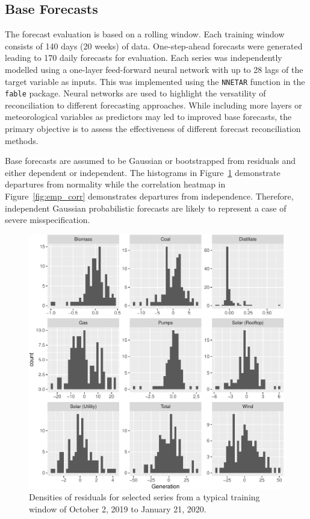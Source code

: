\documentclass[11pt]{article}
\theoremstyle{definition}
\begin{document}
\subsection{Base Forecasts}\label{sec:applbase}

The forecast evaluation is based on a rolling window. Each training window consists of 140 days (20 weeks) of data. One-step-ahead forecasts were generated leading to 170 daily forecasts for evaluation. Each series was independently modelled using a one-layer feed-forward neural network with up to 28 lags of the target variable as inputs. This was implemented using the \verb|NNETAR| function in the \verb|fable| package. Neural networks are used to highlight the versatility of reconciliation to different forecasting approaches. While including more layers or meteorological variables as predictors may led to improved base forecasts, the primary objective is to assess the effectiveness of different forecast reconciliation methods.

Base forecasts are assumed to be Gaussian or bootstrapped from residuals and either dependent or independent. The histograms in Figure~\ref{fig:emp_hist} demonstrate departures from normality while the correlation heatmap in Figure~\ref{fig:emp_corr} demonstrates departures from independence. Therefore, independent Gaussian probabilistic forecasts are likely to represent a case of severe misspecification.

\begin{figure}[H]
	\centering
	\includegraphics[width=.8\textwidth]{Figs/densities.pdf}
	\caption{Densities of residuals for selected series from a typical training window of October 2, 2019 to January 21, 2020.}
	\label{fig:emp_hist}
\end{figure}
\end{document}
